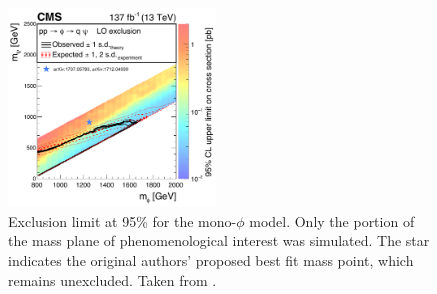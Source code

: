 \begin{figure}[htbp]
 \centering
   \includegraphics[width=0.49\textwidth]{figures/MT2_2019/Figure_015}
   \caption[Exclusion limit at 95\% \CL for the mono-$\phi$ model.]{
     Exclusion limit at 95\% \CL for the mono-$\phi$ model. 
     Only the portion of the mass plane of phenomenological interest was simulated.
     The star indicates the original authors' proposed best fit mass point, which remains unexcluded.
     Taken from \cite{MT2_2019}.}
   \label{fig:monophilimits}
\end{figure}

